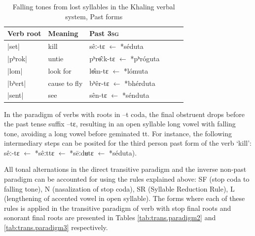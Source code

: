 \documentclass[oldfontcommands,oneside,a4paper,11pt]{article}
\newcommand{\ipa}[1]{{\phon \mbox{#1}}} %
\begin{document}
 
\begin{table}[h] 
\caption{Falling tones from lost syllables in the Khaling verbal system, Past forms} \centering  \label{tab:falling.verb3} 
\begin{tabular}{llllll} 
\toprule 
Verb root	&Meaning	& Past \textsc{3sg} \\ 
\midrule 
|\ipa{set}|	&	kill			&\ipa{sêː-tɛ} $\leftarrow$ \ipa{*séduta}  \\ 
|\ipa{pʰrok}|	&	untie		&\ipa{pʰrɵ̂ːk-tɛ} $\leftarrow$ \ipa{*pʰróguta} \\
|\ipa{lom}|	&	look for		&\ipa{lɵ̂m-tɛ} $\leftarrow$ \ipa{*lómuta}  \\ 
\midrule
|\ipa{bʰert}|	&	cause to fly			&\ipa{bʰêr-tɛ} $\leftarrow$ \ipa{*bhérduta} \\ 
|\ipa{sent}|	&	see			&\ipa{sên-tɛ} $\leftarrow$ \ipa{*sénduta}  \\ 
\bottomrule 
\end{tabular} 
\end{table} 

In the paradigm of verbs with roots in \ipa{--t} coda, the final obstruent drops before the past tense suffix \ipa{--tɛ}, resulting in an open syllable long vowel with falling tone, avoiding a long vowel before geminated \ipa{tt}. For instance, the following intermediary steps can be posited for the third person past form of the verb `kill': \ipa{sêː-tɛ}   $\leftarrow$ \ipa{*sêːttɛ}  $\leftarrow$ \ipa{*sēːdʉtɛ}  $\leftarrow$ \ipa{*séduta}).



All tonal alternations in the direct transitive paradigm and the inverse non-past paradigm can be accounted for using the rules explained above: SF (stop coda to falling tone), N (nasalization of stop coda), SR (Syllable Reduction Rule), L (lengthening of accented vowel in open syllable). The forms where each of these rules is applied in the transitive paradigm of verb with stop final roots and sonorant final roots are presented   in Tables \ref{tab:trans.paradigm2} and \ref{tab:trans.paradigm3} respectively.
\end{document}
